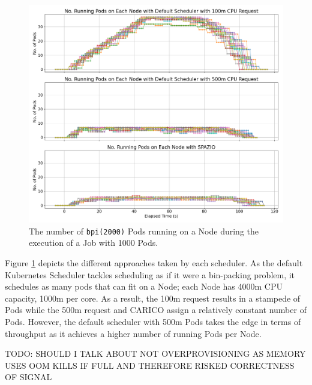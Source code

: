 \begin{figure}[H]
    \centering
    \includegraphics[width=\textwidth]{images/pi-running-pods.png}
    \caption{The number of \texttt{bpi(2000)} Pods running on a Node during the
    execution of a Job with 1000 Pods.}
    \label{fig:pi-2000-1000x-pod-running}
\end{figure}
Figure \ref{fig:pi-2000-1000x-pod-running} depicts the different approaches
taken by each scheduler. As the default Kubernetes Scheduler tackles scheduling
as if it were a bin-packing problem, it schedules as many pods that can fit on a
Node; each Node has 4000m CPU capacity, 1000m per core. As a result, the 100m
request results in a stampede of Pods while the 500m request and CARICO assign
a relatively constant number of Pods. However, the default scheduler with 500m
Pods takes the edge in terms of throughput as it achieves a higher number of
running Pods per Node.


TODO: SHOULD I TALK ABOUT NOT OVERPROVISIONING AS MEMORY USES OOM KILLS IF FULL
AND THEREFORE RISKED CORRECTNESS OF SIGNAL

